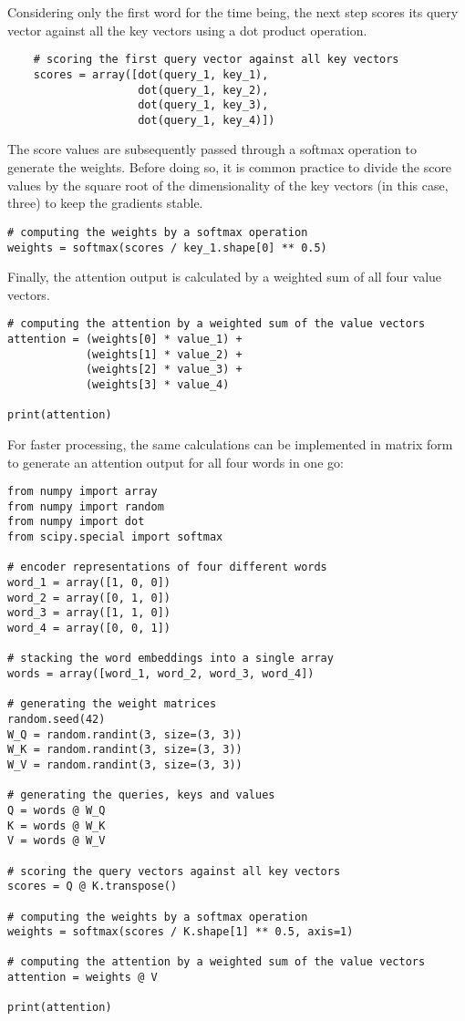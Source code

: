 \documentclass[10pt,a4paper]{article}
\begin{document}
Considering only the first word for the time being, the next step scores its query vector against all the key vectors using a dot product operation. 

\begin{verbatim}
	# scoring the first query vector against all key vectors
	scores = array([dot(query_1, key_1), 
	                dot(query_1, key_2), 
	                dot(query_1, key_3), 
	                dot(query_1, key_4)])
\end{verbatim}

The score values are subsequently passed through a softmax operation to generate the weights. Before doing so, it is common practice to divide the score values by the square root of the dimensionality of the key vectors (in this case, three) to keep the gradients stable. 

\begin{verbatim}
# computing the weights by a softmax operation
weights = softmax(scores / key_1.shape[0] ** 0.5)
\end{verbatim}

Finally, the attention output is calculated by a weighted sum of all four value vectors. 

\begin{verbatim}
# computing the attention by a weighted sum of the value vectors
attention = (weights[0] * value_1) + 
            (weights[1] * value_2) + 
            (weights[2] * value_3) + 
            (weights[3] * value_4)

print(attention)
\end{verbatim}

For faster processing, the same calculations can be implemented in matrix form to generate an attention output for all four words in one go:

\begin{verbatim}
from numpy import array
from numpy import random
from numpy import dot
from scipy.special import softmax

# encoder representations of four different words
word_1 = array([1, 0, 0])
word_2 = array([0, 1, 0])
word_3 = array([1, 1, 0])
word_4 = array([0, 0, 1])

# stacking the word embeddings into a single array
words = array([word_1, word_2, word_3, word_4])

# generating the weight matrices
random.seed(42)
W_Q = random.randint(3, size=(3, 3))
W_K = random.randint(3, size=(3, 3))
W_V = random.randint(3, size=(3, 3))

# generating the queries, keys and values
Q = words @ W_Q
K = words @ W_K
V = words @ W_V

# scoring the query vectors against all key vectors
scores = Q @ K.transpose()

# computing the weights by a softmax operation
weights = softmax(scores / K.shape[1] ** 0.5, axis=1)

# computing the attention by a weighted sum of the value vectors
attention = weights @ V

print(attention)
\end{verbatim}
\end{document}
